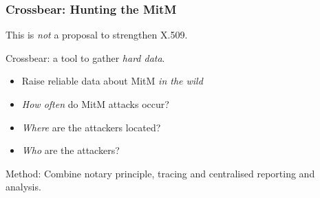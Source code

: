 \begin{frame}
\frametitle{Crossbear: Hunting the MitM}
\begin{block}{This is \textit{not} a proposal to strengthen X.509.}\end{block}
\begin{block}{Crossbear: a tool to gather \textit{hard data}.}
  \begin{itemize}
    \item Raise reliable data about MitM \textit{in the wild}
    \item \textit{How often} do MitM attacks occur?
    \item \textit{Where} are the attackers located?
    \item \textit{Who} are the attackers?
  \end{itemize}
\end{block}
\begin{block}{Method: Combine notary principle, tracing and centralised reporting and analysis.}\end{block}
\end{frame}

